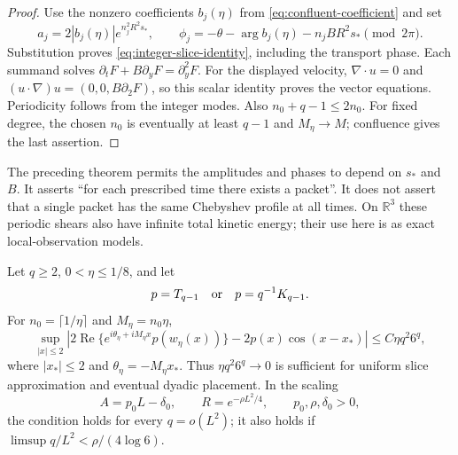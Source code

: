 \begin{proof}
Use the nonzero coefficients $b_j(\eta)$ from
\eqref{eq:confluent-coefficient} and set
\[
 a_j=2|b_j(\eta)|e^{n_j^2R^2s_*},\qquad
 \phi_j=-\theta-\arg b_j(\eta)-n_jBR^2s_*
 \pmod{2\pi}.
\]
Substitution proves \eqref{eq:integer-slice-identity}, including the
transport phase. Each summand solves
$\partial_tF+B\partial_yF=\partial_y^2F$. For the displayed velocity,
$\nabla\cdot u=0$ and $(u\cdot\nabla)u=(0,0,B\partial_2F)$,
so this scalar identity proves the vector equations. Periodicity follows
from the integer modes. Also $n_0+q-1\le2n_0$.
For fixed degree, the chosen $n_0$ is eventually at least $q-1$ and
$M_\eta\to M$; confluence gives the last assertion.
\end{proof}

The preceding theorem permits the amplitudes and phases to depend on
$s_*$ and $B$. It asserts ``for each prescribed time there exists a
packet''. It does not assert that a single packet has the same
Chebyshev profile at all times. On $\mathbb R^3$ these periodic shears
also have infinite total kinetic energy; their use here is as exact
local-observation models.

\begin{lemma}
\label{lem:growing-degree-slice}
Let $q\ge2$, $0<\eta\le1/8$, and let
\[
 p=T_{q-1}\quad\hbox{or}\quad p=q^{-1}K_{q-1}.
\]
For $n_0=\lceil1/\eta\rceil$ and $M_\eta=n_0\eta$,
\begin{equation}\label{eq:uniform-slice-error}
 \sup_{|x|\le2}
 \left|2\operatorname{Re}
 \{e^{i\theta_\eta+iM_\eta x}p(w_\eta(x))\}
 -2p(x)\cos(x-x_*)\right|
 \le C\eta q^2 6^q,
\end{equation}
where $|x_*|\le2$ and $\theta_\eta=-M_\eta x_*$.
Thus $\eta q^2 6^q\to0$ is sufficient for uniform slice approximation
and eventual dyadic placement. In the scaling
\[
 A=p_0L-\delta_0,\qquad
 R=e^{-\rho L^2/4},\qquad p_0,\rho,\delta_0>0,
\]
the condition holds for every $q=o(L^2)$; it also holds if
$\limsup q/L^2<\rho/(4\log6)$.
\end{lemma}

